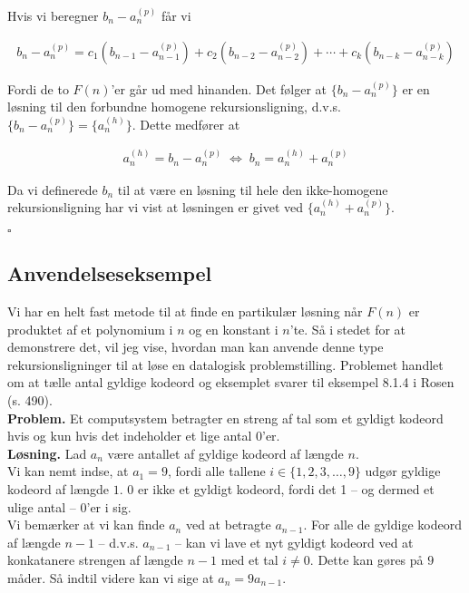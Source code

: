 \documentclass[12pt]{article}
\begin{document}
Hvis vi beregner $b_n - a_n^{(p)}$ får vi

\begin{align*}
    b_n-a_n^{(p)} = c_1(b_{n-1}- a_{n-1}^{(p)}) + c_2(b_{n-2} - a_{n-2}^{(p)}) + \cdots + c_k(b_{n-k}-a_{n-k}^{(p)})
\end{align*}

Fordi de to $F(n)$'er går ud med hinanden. Det følger at $\{b_n-a_n^{(p)}\}$ er en løsning til den forbundne homogene rekursionsligning, d.v.s. $\{b_n-a_n^{(p)}\}=\{a_n^{(h)}\}$. Dette medfører at 

\begin{align*}
    a_n^{(h)} = b_n - a_n^{(p)} \; \Leftrightarrow \; b_n = a_n^{(h)} + a_n^{(p)}
\end{align*}

Da vi definerede $b_n$ til at være en løsning til hele den ikke-homogene rekursionsligning har vi vist at løsningen er givet ved $\{a_n^{(h)} + a_n^{(p)}\}$.

\begin{flushright}
    $\square$
\end{flushright}

\subsection*{Anvendelseseksempel}

Vi har en helt fast metode til at finde en partikulær løsning når $F(n)$ er produktet af et polynomium i $n$ og en konstant i $n$'te. Så i stedet for at demonstrere det, vil jeg vise, hvordan man kan anvende denne type rekursionsligninger til at løse en datalogisk problemstilling. Problemet handlet om at tælle antal gyldige kodeord og eksemplet svarer til eksempel 8.1.4 i Rosen (s. 490). \\

\textbf{Problem.} Et computsystem betragter en streng af tal som et gyldigt kodeord hvis og kun hvis det indeholder et lige antal $0$'er. \\

\textbf{Løsning.} Lad $a_n$ være antallet af gyldige kodeord af længde $n$. \\

Vi kan nemt indse, at $a_1=9$, fordi alle tallene $i \in \{1,2,3,\ldots,9\}$ udgør gyldige kodeord af længde $1$. $0$ er ikke et gyldigt kodeord, fordi det 1 -- og dermed et ulige antal -- $0$'er i sig. \\

Vi bemærker at vi kan finde $a_n$ ved at betragte $a_{n-1}$. For alle de gyldige kodeord af længde $n-1$ -- d.v.s. $a_{n-1}$ -- kan vi lave et nyt gyldigt kodeord ved at konkatanere strengen af længde $n-1$ med et tal $i \ne 0$. Dette kan gøres på $9$ måder. Så indtil videre kan vi sige at $a_n = 9a_{n-1}$.\\
\end{document}
